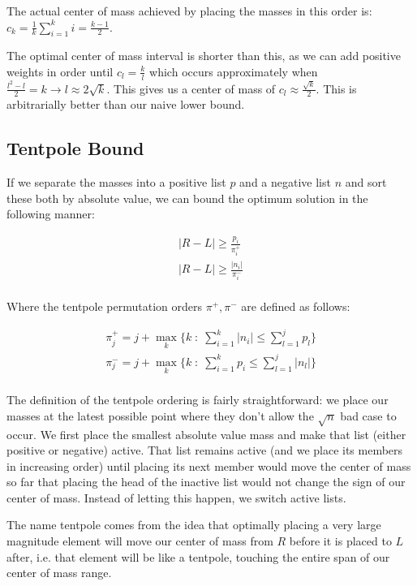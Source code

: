 The actual center of mass achieved by placing the masses in this order is: $ c_k = \frac{1}{k} \sum_{i=1}^k i = \frac{k-1}{2} $.

The optimal center of mass interval is shorter than this, as we can add positive weights in order until $ c_l = \frac{k}{l} $ which occurs approximately when $ \frac{l^2 - l}{2} = k \rightarrow l \approx 2\sqrt{k} $. This gives us a center of mass of $ c_l \approx \frac{\sqrt{k}}{2} $.  This is arbitrarially better than our naive lower bound.

\subsection{Tentpole Bound} \label{subs:tentpoleBound}

If we separate the masses into a positive list $ p $ and a negative list $ n $ and sort these both by absolute value, we can bound the optimum solution in the following manner:

\begin{eqnarray*}
|R-L| \geq \frac{p_{i}}{\pi^+_i} \\
|R-L| \geq \frac{|n_{i}|}{\pi^-_i} \\
\end{eqnarray*} 

Where the tentpole permutation orders $ \pi^+, \pi^- $ are defined as follows:

\begin{eqnarray*}
\pi^+_j = j + \max_k \{ k \; :\; \sum_{i=1}^k |n_i| \leq \sum_{l=1}^j p_l \}  \\
\pi^-_j = j + \max_k \{ k \; :\; \sum_{i=1}^k p_i \leq \sum_{l=1}^j |n_l| \} \\
\end{eqnarray*} 

The definition of the tentpole ordering is fairly straightforward: we place our masses at the latest possible point where they don't allow the $\sqrt{n}$ bad case to occur.  We first place the smallest absolute value mass and make that list (either positive or negative) active.  That list remains active (and we place its members in increasing order) until placing its next member would move the center of mass so far that placing the head of the inactive list would not change the sign of our center of mass.  Instead of letting this happen, we switch active lists.

The name tentpole comes from the idea that optimally placing a very large magnitude element will move our center of mass from $R$ before it is placed to $L$ after, i.e. that element will be like a tentpole, touching the entire span of our center of mass range.

